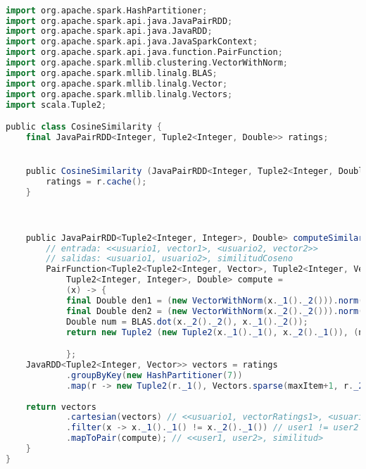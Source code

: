 \newpage

\begin{lstlisting}[language=Scala, caption={Class CosineSimilarity},label=trends]

import org.apache.spark.HashPartitioner;
import org.apache.spark.api.java.JavaPairRDD;
import org.apache.spark.api.java.JavaRDD;
import org.apache.spark.api.java.JavaSparkContext;
import org.apache.spark.api.java.function.PairFunction;
import org.apache.spark.mllib.clustering.VectorWithNorm;
import org.apache.spark.mllib.linalg.BLAS;
import org.apache.spark.mllib.linalg.Vector;
import org.apache.spark.mllib.linalg.Vectors;
import scala.Tuple2;

public class CosineSimilarity {
    final JavaPairRDD<Integer, Tuple2<Integer, Double>> ratings;


    public CosineSimilarity (JavaPairRDD<Integer, Tuple2<Integer, Double>> r) {
        ratings = r.cache();
    }



    public JavaPairRDD<Tuple2<Integer, Integer>, Double> computeSimilarity (final Integer maxItem){
        // entrada: <<usuario1, vector1>, <usuario2, vector2>>
        // salidas: <usuario1, usuario2>, similitudCoseno
        PairFunction<Tuple2<Tuple2<Integer, Vector>, Tuple2<Integer, Vector>>,
            Tuple2<Integer, Integer>, Double> compute =
            (x) -> {
            final Double den1 = (new VectorWithNorm(x._1()._2())).norm();
            final Double den2 = (new VectorWithNorm(x._2()._2())).norm();
            Double num = BLAS.dot(x._2()._2(), x._1()._2());
            return new Tuple2 (new Tuple2(x._1()._1(), x._2()._1()), (num / (den1 * den2)));

            };
    JavaRDD<Tuple2<Integer, Vector>> vectors = ratings
            .groupByKey(new HashPartitioner(7))
            .map(r -> new Tuple2(r._1(), Vectors.sparse(maxItem+1, r._2()))); // <usuario, vectorRatings>
    
    return vectors
            .cartesian(vectors) // <<usuario1, vectorRatings1>, <usuario2, vectorRatings2>>
            .filter(x -> x._1()._1() != x._2()._1()) // user1 != user2
            .mapToPair(compute); // <<user1, user2>, similitud>
    }
}
\end{lstlisting}


